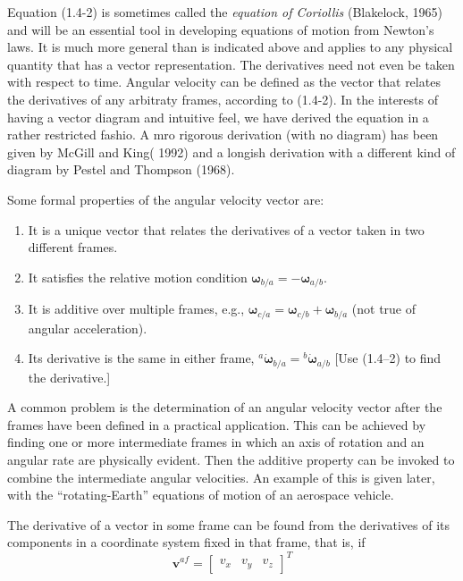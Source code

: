 Equation (1.4-2) is sometimes called the \textit{equation of Coriollis} (Blakelock, 1965) and will be an essential tool in developing equations of motion from Newton's laws. It is much more general than is indicated above and applies to any physical quantity that has a vector representation. The derivatives need not even be taken with respect to time. Angular velocity can be defined as the vector that relates the derivatives of any arbitraty frames, according to (1.4-2). In the interests of having a vector diagram and intuitive feel, we have derived the equation in a rather restricted fashio. A mro rigorous derivation (with no diagram) has been given by McGill and King( 1992) and a longish derivation with a different kind of diagram by Pestel and Thompson (1968).

Some formal properties of the angular velocity vector are:
\begin{enumerate}[label=\alph*)]
\item It is a unique vector that relates the derivatives of a vector taken in two different frames.
\item It satisfies the relative motion condition \(\mathbf{\omega}_{b/a} = - \mathbf{\omega}_{a/b}\).
\item It is additive over multiple frames, e.g., \(\mathbf{\omega}_{c/a} = \!\mathbf{\omega}_{c/b} + \mathbf{\omega}_{b/a}\) (not true of angular acceleration).
\item Its derivative is the same in either frame, \({^{a}\dot{\mathbf{\omega}}_{b/a}} = {^{b}\dot{\mathbf{\omega}}_{a/b}} \) [Use (1.4--2) to find the derivative.]
\end{enumerate}

A common problem is the determination of an angular velocity vector after the frames have been defined in a practical application. This can be achieved by finding one or more intermediate frames in which an axis of rotation and an angular rate are physically evident. Then the additive property can be invoked to combine the intermediate angular velocities. An example of this is given later, with the ``rotating-Earth'' equations of motion of an aerospace vehicle.

The derivative of a vector in some frame can be found from the derivatives of its components in a coordinate system fixed in that frame, that is, if
\begin{equation*}
    \mathbf{v}^{a\!f} = \begin{bmatrix} v_{x} & v_{y} & v_{z} \end{bmatrix}^{T}
\end{equation*}

